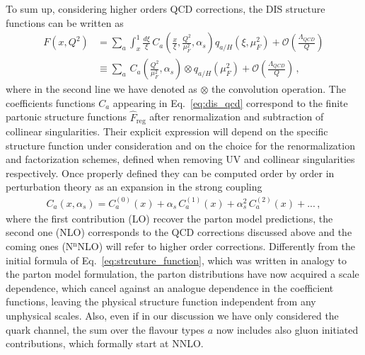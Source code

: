 %
To sum up, considering higher orders QCD corrections, the DIS structure functions can be written
as
\begin{align}
    \label{eq:dis_qcd}
    F\left(x,Q^2\right) &= 
    \sum_a \int_x^1\frac{d\xi}{\xi}\,C_a\left(\frac{x}{\xi},\frac{Q^2}{\mu_F^2}, \alpha_s\right)q_{a/H}\left(\xi,\mu_F^2\right)
    +\mathcal{O}\left(\frac{\Lambda_{QCD}}{Q}\right) \nonumber\\
    & \equiv \sum_a \,C_a\left(\frac{Q^2}{\mu_F^2}, \alpha_s\right) \otimes q_{a/H}\left(\mu_F^2\right)
    +\mathcal{O}\left(\frac{\Lambda_{QCD}}{Q}\right)\,,
\end{align}
where in the second line we have denoted as $\otimes$ the convolution operation.
The coefficients functions $C_a$ appearing in Eq.~\eqref{eq:dis_qcd} correspond to the finite partonic structure 
functions $\hat{F}_{\text{reg}}$ after renormalization and subtraction of collinear singularities.
Their explicit expression will depend on the specific structure function under consideration
and on the choice for the renormalization and factorization schemes, defined when removing UV and collinear
singularities respectively. 
Once properly defined they can be computed order by order in perturbation theory as an expansion in the strong coupling
\begin{align}
    \label{eq:coeff_functions_expansion}
    C_a\left(x, \alpha_s\right) = C_a^{(0)}\left(x\right) + \alpha_s\, C_a^{(1)}\left(x\right) 
    + \alpha_s^2\, C_a^{(2)}\left(x\right) + ...\,,
\end{align}
where the first contribution (LO) recover the parton model predictions, the second one (NLO) corresponds to the QCD
corrections discussed above and the coming ones (N$^{\text{n}}$NLO) will refer to higher order corrections.
Differently from the initial formula of Eq.~\eqref{eq:strcuture_function}, which was written in analogy to
the parton model formulation, the parton distributions
have now acquired a scale dependence, which cancel against an analogue dependence in the coefficient functions,
leaving the physical structure function independent from any unphysical scales. Also, even if in our 
discussion we have only considered the quark channel, the sum over the flavour types $a$ now includes
also gluon initiated contributions, which formally start at NNLO.


